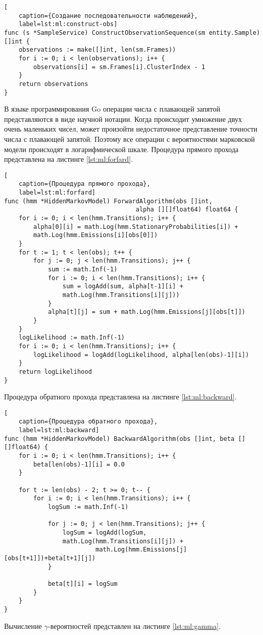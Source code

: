 \begin{lstlisting}[
	caption={Создание последовательности наблюдений},
	label=lst:ml:construct-obs]
func (s *SampleService) ConstructObservationSequence(sm entity.Sample) []int {
	observations := make([]int, len(sm.Frames))
	for i := 0; i < len(observations); i++ {
		observations[i] = sm.Frames[i].ClusterIndex - 1
	}
	return observations
}
\end{lstlisting}
В языке программирования Go операции числа с плавающей запятой представляются в виде научной нотации. Когда происходит умножение двух очень маленьких чисел, может произойти недостаточное представление точности числа с плавающей запятой. Поэтому все операции с вероятностями марковской модели происходят в логарифмической шкале.
Процедура прямого прохода  представлена на листинге \ref{lst:ml:forfard}.
\begin{lstlisting}[
	caption={Процедура прямого прохода},
	label=lst:ml:forfard]
func (hmm *HiddenMarkovModel) ForwardAlgorithm(obs []int,
									alpha [][]float64) float64 {
	for i := 0; i < len(hmm.Transitions); i++ {
		alpha[0][i] = math.Log(hmm.StationaryProbabilities[i]) +
		math.Log(hmm.Emissions[i][obs[0]])
	}
	for t := 1; t < len(obs); t++ {
		for j := 0; j < len(hmm.Transitions); j++ {
			sum := math.Inf(-1)
			for i := 0; i < len(hmm.Transitions); i++ {
				sum = logAdd(sum, alpha[t-1][i] + 
				math.Log(hmm.Transitions[i][j]))
			}
			alpha[t][j] = sum + math.Log(hmm.Emissions[j][obs[t]])
		}
	}
	logLikelihood := math.Inf(-1)
	for i := 0; i < len(hmm.Transitions); i++ {
		logLikelihood = logAdd(logLikelihood, alpha[len(obs)-1][i])
	}
	return logLikelihood
}
\end{lstlisting}
Процедура обратного прохода представлена на листинге \ref{lst:ml:backward}. 
\begin{lstlisting}[
	caption={Процедура обратного прохода},
	label=lst:ml:backward]
func (hmm *HiddenMarkovModel) BackwardAlgorithm(obs []int, beta [][]float64) {
	for i := 0; i < len(hmm.Transitions); i++ {
		beta[len(obs)-1][i] = 0.0
	}
	
	for t := len(obs) - 2; t >= 0; t-- {
		for i := 0; i < len(hmm.Transitions); i++ {
			logSum := math.Inf(-1)
			
			for j := 0; j < len(hmm.Transitions); j++ {
				logSum = logAdd(logSum,
				math.Log(hmm.Transitions[i][j]) + 
						 math.Log(hmm.Emissions[j][obs[t+1]])+beta[t+1][j])
			}
		
			beta[t][i] = logSum
		}
	}
}
\end{lstlisting}
Вычисление $\gamma$-вероятностей представлен на листинге \ref{lst:ml:gamma}.
